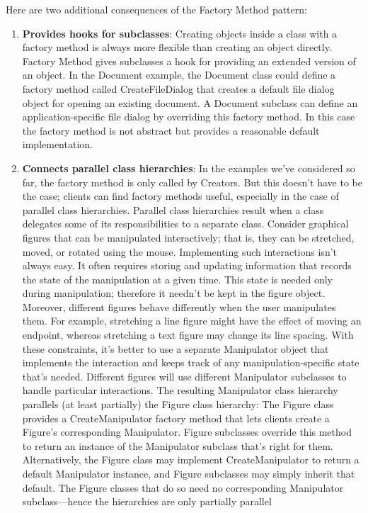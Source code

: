 \documentclass{report}
\begin{document}
\begin{itemize}
            \bigbreak \noindent 
            Here are two additional consequences of the Factory Method pattern:
            \begin{enumerate}
                \item \textbf{Provides hooks for subclasses}: Creating objects inside a class with a factory method is always more flexible than creating an object directly. Factory Method gives subclasses a hook for providing an extended version of an object.
                    \bigbreak \noindent 
                    In the Document example, the Document class could define a factory method called CreateFileDialog that creates a default file dialog object for opening an existing document. A Document subclass can define an application-specific file dialog by overriding this factory method. In this case the factory method is not abstract but provides a reasonable default implementation.
                \item \textbf{Connects parallel class hierarchies}: In the examples we've considered so far, the factory method is only called by Creators. But this doesn't have to be the case; clients can find factory methods useful, especially in the case of parallel class hierarchies.
                    \bigbreak \noindent 
                    Parallel class hierarchies result when a class delegates some of its responsibilities to a separate class. Consider graphical figures that can be manipulated interactively; that is, they can be stretched, moved, or rotated using the mouse. Implementing such interactions isn't always easy. It often requires storing and updating information that records the state of the manipulation at a given time. This state is needed only during manipulation; therefore it needn't be kept in the figure object. Moreover, different figures behave differently when the user manipulates them. For example, stretching a line figure might have the effect of moving an endpoint, whereas stretching a text figure may change its line spacing.
                    \bigbreak \noindent 
                    With these constraints, it's better to use a separate Manipulator object that implements the interaction and keeps track of any manipulation-specific state that's needed. Different figures will use different Manipulator subclasses to handle particular interactions. The resulting Manipulator class hierarchy parallels (at least partially) the Figure class hierarchy:
                    \bigbreak \noindent 
                    \bigbreak \noindent 
                    The Figure class provides a CreateManipulator factory method that lets clients create a Figure's corresponding Manipulator. Figure subclasses override this method to return an instance of the Manipulator subclass that's right for them. Alternatively, the Figure class may implement CreateManipulator to return a default Manipulator instance, and Figure subclasses may simply inherit that default. The Figure classes that do so need no corresponding Manipulator subclass—hence the hierarchies are only partially parallel

\end{enumerate}
\end{itemize}
\end{document}
